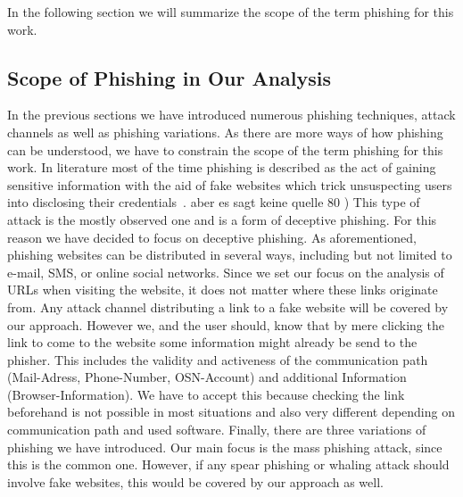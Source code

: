  In the following section we will summarize the scope of the term phishing for this work.

\subsection{Scope of Phishing in Our Analysis}
\label{s:scope}
In the previous sections we have introduced numerous phishing techniques, attack channels as well as phishing variations.
 As there are more ways of how phishing can be understood, we have to constrain the scope of the term phishing for this work.
 In literature most of the time phishing is described as the act of gaining sensitive information with the aid of fake websites which trick unsuspecting users into disclosing their credentials~\cite{sheng2007antiphishingphil, antiphishingtrendreport2013, kasperskyreport2013}.
 aber es sagt keine quelle 80 %
)
This type of attack is the mostly observed one and is a form of deceptive phishing.
 For this reason we have decided to focus on deceptive phishing.
 As aforementioned, phishing websites can be distributed in several ways, including but not limited to e-mail, SMS, or online social networks.
 Since we set our focus on the analysis of URLs when visiting the website, it does not matter where these links originate from.
 Any attack channel distributing a link to a fake website will be covered by our approach.
 However we, and the user should, know that by mere clicking the link to come to the website some information might already be send to the phisher.
 This includes the validity and activeness of the communication path (Mail-Adress, Phone-Number, OSN-Account) and additional Information (Browser-Information). We have to accept this because checking the link beforehand is not possible in most situations and also very different depending on communication path and used software.
  Finally, there are three variations of phishing we have introduced.
 Our main focus is the mass phishing attack, since this is the common one.
 However, if any spear phishing or whaling attack should involve fake websites, this would be covered by our approach as well.


